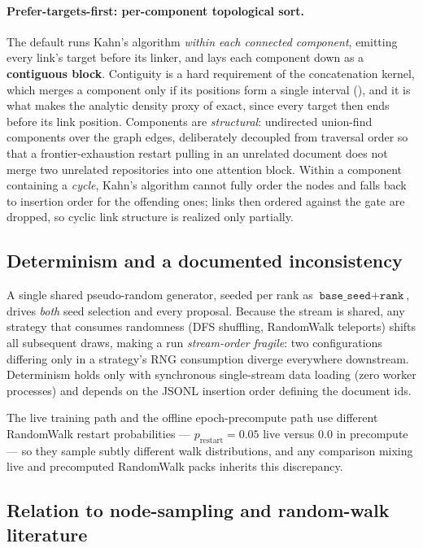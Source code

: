 \paragraph{Prefer-targets-first: per-component topological sort.}
The default runs Kahn's algorithm \emph{within each connected component}, emitting every
link's target before its linker, and lays each component down as a \textbf{contiguous
block}. Contiguity is a hard requirement of the concatenation kernel, which merges a
component only if its positions form a single interval (), and it is
what makes the analytic density proxy of  exact, since every target
then ends before its link position. Components are \emph{structural}: undirected
union-find components over the graph edges, deliberately decoupled from traversal order
so that a frontier-exhaustion restart pulling in an unrelated document does not merge two
unrelated repositories into one attention block. Within a component containing a
\emph{cycle}, Kahn's algorithm cannot fully order the nodes and falls back to insertion
order for the offending ones; links then ordered against the gate are dropped, so cyclic
link structure is realized only partially.

\subsection{Determinism and a documented inconsistency}
\label{app:traversal:det}

A single shared pseudo-random generator, seeded per rank as $\texttt{base\_seed}+
\texttt{rank}$, drives \emph{both} seed selection and every proposal. Because the stream
is shared, any strategy that consumes randomness (DFS shuffling, RandomWalk teleports)
shifts all subsequent draws, making a run \emph{stream-order fragile}: two configurations
differing only in a strategy's RNG consumption diverge everywhere downstream. Determinism
holds only with synchronous single-stream data loading (zero worker processes) and
depends on the JSONL insertion order defining the document ids.

The live training path and the offline epoch-precompute path use different RandomWalk
restart probabilities --- $p_\text{restart}=0.05$ live versus $0.0$ in precompute --- so
they sample subtly different walk distributions, and any comparison mixing live and
precomputed RandomWalk packs inherits this discrepancy.

\subsection{Relation to node-sampling and random-walk literature}
\label{app:traversal:related}

